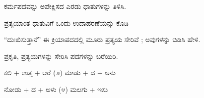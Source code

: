 \vspace{2.5pt plus 3pt minus 0.5pt}\noindent\hspace*{1.2em}\hspace{0.55em}ಕರ್ಮಪದವನ್ನು ಅಪೇಕ್ಷಿಸದ ಎರಡು ಧಾತುಗಳನ್ನು ತಿಳಿಸಿ.\par

\vspace{2.5pt plus 3pt minus 0.5pt}\noindent\hspace*{1.2em}\hspace{0.55em}ಪ್ರತ್ಯಯಾಂತ ಧಾತುವಿಗೆ ಒಂದು ಉದಾಹರಣೆಯನ್ನು ಕೊಡಿ\par

\vspace{2.5pt plus 3pt minus 0.5pt}\noindent\hspace*{1.2em}\hspace{0.55em}“ದುಃಖಿಸುತ್ತಾನೆ” ಈ ಕ್ರಿಯಾಪದದಲ್ಲಿ ಮೂರು ಪ್ರತ್ಯಯ ಸೇರಿವೆ ; ಅವುಗಳನ್ನು ಬಿಡಿಸಿ ಹೇಳಿ.\par

\vspace{2.5pt plus 3pt minus 0.5pt}\noindent\hspace*{1.2em}\hspace{0.55em}ಪ್ರಕೃತಿ, ಪ್ರತ್ಯಯಗಳನ್ನು ಸೇರಿಸಿ ಪದಗಳನ್ನು ಬರೆಯಿರಿ.\par

\vspace{2.5pt plus 3pt minus 0.5pt}\noindent\hspace*{1.2em}\hspace{0.55em}ಕಲಿ + ಉತ್ತ + ಆರೆ (೨) ಮಾಡು + ದ + ಅನು\par

\vspace{2.5pt plus 3pt minus 0.5pt}\noindent\hspace*{1.2em}\hspace{0.55em}ನೋಡು + ದ + ಅಳು (೪) ಮಲಗು + ಇಸು\par
